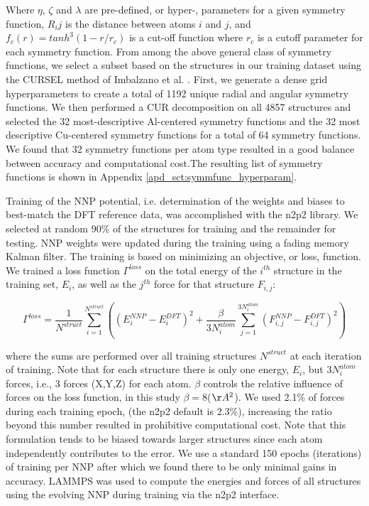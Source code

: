 \documentclass{article}
\begin{document}
Where $\eta$, $\zeta$ and $\lambda$ are pre-defined, or hyper-, parameters for a given symmetry function, $R_ij$ is the distance between atoms $i$ and $j$, and $f_c(r) = tanh^3(1-r/r_c)$ is a cut-off function where $r_c$ is a cutoff parameter for each symmetry function.
From among the above general class of symmetry functions, we select a subset based on the structures in our training dataset using the CURSEL method of Imbalzano et al. \cite{Imbalzano2018}.
First, we generate a dense grid hyperparameters to create a total of 1192 unique radial and angular symmetry functions.
We then performed a CUR decomposition on all 4857 structures and selected the 32 most-descriptive Al-centered symmetry functions and the 32 most descriptive Cu-centered symmetry functions for a total of 64 symmetry functions.
We found that 32 symmetry functions per atom type resulted in a good balance between accuracy and computational cost.The resulting list of symmetry functions is shown in Appendix \ref{apd_sct:symmfunc_hyperparam}.

Training of the NNP potential, i.e. determination of the weights and biases to best-match the DFT reference data, was accomplished with the n2p2 library\cite{Singraber2019ParallelPotentials}\cite{Singraber2019Library-BasedPotentials}.
We selected at random 90\% of the structures for training and the remainder for testing.
NNP weights were updated during the training using a fading memory Kalman filter.
The training is based on minimizing an objective, or loss, function.
We trained a loss function $\Gamma^{loss}$ on the total energy of the $i^{th}$ structure in the training set, $E_i$, as well as the $j^{th}$ force for that structure $F_{i,j}$:

\begin{equation}
\Gamma^{loss} = \frac{1}{N^{struct}} \sum^{N^{struct}}_{i=1}((E^{NNP}_i-E^{DFT}_i)^2+\frac{\beta}{3N^{atom}_i}\sum^{3N^{atom}_{i}}_{j=1}(F^{NNP}_{i,j}-F^{DFT}_{i,j})^2)
\end{equation}

where the sums are performed over all training structures $N^{struct}$ at each iteration of training.
Note that for each structure there is only one energy, $E_i$, but $3N^{atom}_i$ forces, i.e., 3 forces (X,Y,Z) for each atom.
$\beta$ controls the relative influence of forces on the loss function, in this study $\beta = 8$($\AA^2$).
We used 2.1\% of forces during each training epoch, (the n2p2 default is 2.3\%), increasing the ratio beyond this number resulted in prohibitive computational cost.
Note that this formulation tends to be biased towards larger structures since each atom independently contributes to the error. 
We use a standard 150 epochs (iterations) of training per NNP after which we found there to be only minimal gains in accuracy.  LAMMPS\cite{Plimpton1995} was used to compute the energies and forces of all structures using the evolving NNP during training via the n2p2 interface. 
\end{document}
